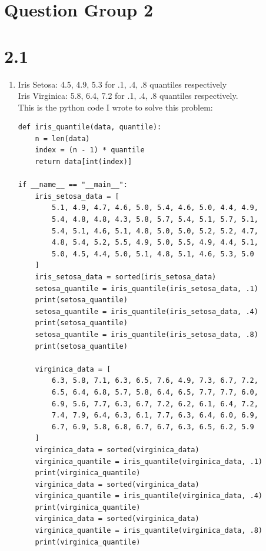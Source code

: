 \documentclass{article}
\begin{document}
\section*{Question Group 2}
\section*{2.1}
\begin{enumerate}
\item Iris Setosa: 4.5, 4.9, 5.3 for .1, .4, .8 quantiles respectively \\
Iris Virginica: 5.8, 6.4, 7.2 for .1, .4, .8 quantiles respectively. \\
This is the python code I wrote to solve this problem: \\
\begin{verbatim}
def iris_quantile(data, quantile):
    n = len(data)
    index = (n - 1) * quantile
    return data[int(index)]

if __name__ == "__main__":
    iris_setosa_data = [
        5.1, 4.9, 4.7, 4.6, 5.0, 5.4, 4.6, 5.0, 4.4, 4.9,
        5.4, 4.8, 4.8, 4.3, 5.8, 5.7, 5.4, 5.1, 5.7, 5.1,
        5.4, 5.1, 4.6, 5.1, 4.8, 5.0, 5.0, 5.2, 5.2, 4.7,
        4.8, 5.4, 5.2, 5.5, 4.9, 5.0, 5.5, 4.9, 4.4, 5.1,
        5.0, 4.5, 4.4, 5.0, 5.1, 4.8, 5.1, 4.6, 5.3, 5.0
    ]
    iris_setosa_data = sorted(iris_setosa_data)
    setosa_quantile = iris_quantile(iris_setosa_data, .1)
    print(setosa_quantile)
    setosa_quantile = iris_quantile(iris_setosa_data, .4)
    print(setosa_quantile)
    setosa_quantile = iris_quantile(iris_setosa_data, .8)
    print(setosa_quantile)

    virginica_data = [
        6.3, 5.8, 7.1, 6.3, 6.5, 7.6, 4.9, 7.3, 6.7, 7.2,
        6.5, 6.4, 6.8, 5.7, 5.8, 6.4, 6.5, 7.7, 7.7, 6.0,
        6.9, 5.6, 7.7, 6.3, 6.7, 7.2, 6.2, 6.1, 6.4, 7.2,
        7.4, 7.9, 6.4, 6.3, 6.1, 7.7, 6.3, 6.4, 6.0, 6.9,
        6.7, 6.9, 5.8, 6.8, 6.7, 6.7, 6.3, 6.5, 6.2, 5.9
    ]
    virginica_data = sorted(virginica_data)
    virginica_quantile = iris_quantile(virginica_data, .1)
    print(virginica_quantile)
    virginica_data = sorted(virginica_data)
    virginica_quantile = iris_quantile(virginica_data, .4)
    print(virginica_quantile)
    virginica_data = sorted(virginica_data)
    virginica_quantile = iris_quantile(virginica_data, .8)
    print(virginica_quantile)
\end{verbatim}
\end{enumerate}
\end{document}
